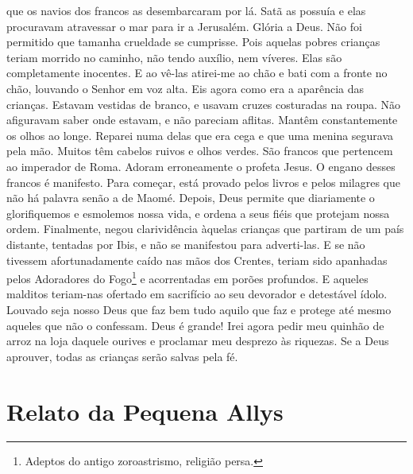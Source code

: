 que os navios dos francos as desembarcaram por lá. Satã as possuía e elas
procuravam atravessar o mar para ir a Jerusalém. Glória a Deus. Não foi
permitido que tamanha crueldade se cumprisse. Pois aquelas pobres crianças
teriam morrido no caminho, não tendo auxílio, nem víveres. Elas são
completamente inocentes. E ao vê-las atirei-me ao chão e bati com a fronte
no chão, louvando o Senhor em voz alta. Eis agora como era a aparência das
crianças. Estavam vestidas de branco, e usavam cruzes costuradas na roupa.
Não afiguravam saber onde estavam, e não pareciam aflitas. Mantêm
constantemente os olhos ao longe. Reparei numa delas que era cega e que
uma menina segurava pela mão. Muitos têm cabelos ruivos e olhos verdes.
São francos que pertencem ao imperador de Roma. Adoram erroneamente o
profeta Jesus. O engano desses francos é manifesto. Para começar, está
provado pelos livros e pelos milagres que não há palavra senão a de Maomé.
Depois, Deus permite que diariamente o glorifiquemos e esmolemos nossa
vida, e ordena a seus fiéis que protejam nossa ordem. Finalmente, negou
clarividência àquelas crianças que partiram de um país distante, tentadas
por Ibis, e não se manifestou para adverti-las. E se não tivessem
afortunadamente caído nas mãos dos Crentes, teriam sido apanhadas pelos
Adoradores do Fogo\footnote{ Adeptos do antigo zoroastrismo, religião
persa.} e acorrentadas em porões profundos. E aqueles malditos teriam-nas
ofertado em sacrifício ao seu devorador e detestável ídolo. Louvado seja
nosso Deus que faz bem tudo aquilo que faz e protege até mesmo aqueles que
não o confessam. Deus é grande! Irei agora pedir meu quinhão de arroz na
loja daquele ourives e proclamar meu desprezo às riquezas. Se a Deus
aprouver, todas as crianças serão salvas pela fé.

\chapter{Relato da Pequena Allys}

